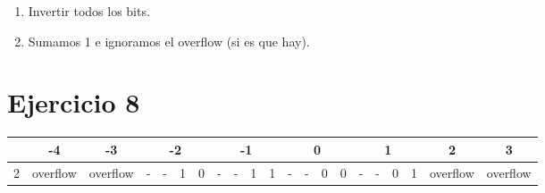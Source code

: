 \begin{enumerate}
  \item Invertir todos los bits.
  \item Sumamos 1 e ignoramos el overflow (si es que hay).
\end{enumerate}

\section{Ejercicio 8}

\begin{table}[ht]
  \ttfamily
  \setlength\tabcolsep{5pt}
  \begin{tabular}{|c|cccc|cccc|cccc|cccc|cccc|cccc|cccc|cccc|}
  \hline
    & \multicolumn{4}{c|}{-4}                                                                                                      & \multicolumn{4}{c|}{-3}                                                                                                      & \multicolumn{4}{c|}{-2}                                                                                                                              & \multicolumn{4}{c|}{-1}                                                                                                                              & \multicolumn{4}{c|}{0}                                                                                                                               & \multicolumn{4}{c|}{1}                                                                                                                               & \multicolumn{4}{c|}{2}                                                                                                       & \multicolumn{4}{c|}{3}                                                                                                       \\ \hline
  2 & \multicolumn{4}{c|}{\cellcolor[HTML]{C0C0C0}overflow}                                                                        & \multicolumn{4}{c|}{\cellcolor[HTML]{C0C0C0}overflow}                                                                        & \multicolumn{1}{c|}{\cellcolor[HTML]{C0C0C0}-} & \multicolumn{1}{c|}{\cellcolor[HTML]{C0C0C0}-} & \multicolumn{1}{c|}{\cellcolor[HTML]{EFEFEF}1} & 0 & \multicolumn{1}{c|}{\cellcolor[HTML]{C0C0C0}-} & \multicolumn{1}{c|}{\cellcolor[HTML]{C0C0C0}-} & \multicolumn{1}{c|}{\cellcolor[HTML]{EFEFEF}1} & 1 & \multicolumn{1}{c|}{\cellcolor[HTML]{C0C0C0}-} & \multicolumn{1}{c|}{\cellcolor[HTML]{C0C0C0}-} & \multicolumn{1}{c|}{\cellcolor[HTML]{EFEFEF}0} & 0 & \multicolumn{1}{c|}{\cellcolor[HTML]{C0C0C0}-} & \multicolumn{1}{c|}{\cellcolor[HTML]{C0C0C0}-} & \multicolumn{1}{c|}{\cellcolor[HTML]{EFEFEF}0} & 1 & \multicolumn{4}{c|}{\cellcolor[HTML]{C0C0C0}overflow}                                                                        & \multicolumn{4}{c|}{\cellcolor[HTML]{C0C0C0}overflow}                                                                        \\ \hline

\end{tabular}
\end{table}

